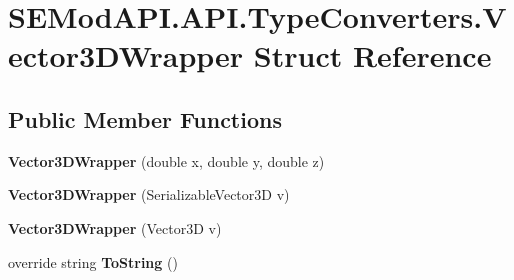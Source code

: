 \hypertarget{struct_s_e_mod_a_p_i_1_1_a_p_i_1_1_type_converters_1_1_vector3_d_wrapper}{}\section{S\+E\+Mod\+A\+P\+I.\+A\+P\+I.\+Type\+Converters.\+Vector3\+D\+Wrapper Struct Reference}
\label{struct_s_e_mod_a_p_i_1_1_a_p_i_1_1_type_converters_1_1_vector3_d_wrapper}
\subsection*{Public Member Functions}
\begin{DoxyCompactItemize}
\item 
\hypertarget{struct_s_e_mod_a_p_i_1_1_a_p_i_1_1_type_converters_1_1_vector3_d_wrapper_a7051905668d1cf6e0e4604af47ca4b85}{}{\bfseries Vector3\+D\+Wrapper} (double x, double y, double z)\label{struct_s_e_mod_a_p_i_1_1_a_p_i_1_1_type_converters_1_1_vector3_d_wrapper_a7051905668d1cf6e0e4604af47ca4b85}

\item 
\hypertarget{struct_s_e_mod_a_p_i_1_1_a_p_i_1_1_type_converters_1_1_vector3_d_wrapper_a9c2ccf83450d8d45e885a6e7478cc19a}{}{\bfseries Vector3\+D\+Wrapper} (Serializable\+Vector3\+D v)\label{struct_s_e_mod_a_p_i_1_1_a_p_i_1_1_type_converters_1_1_vector3_d_wrapper_a9c2ccf83450d8d45e885a6e7478cc19a}

\item 
\hypertarget{struct_s_e_mod_a_p_i_1_1_a_p_i_1_1_type_converters_1_1_vector3_d_wrapper_ac1474f5ecb63f11e7368c9008bcb9ff1}{}{\bfseries Vector3\+D\+Wrapper} (Vector3\+D v)\label{struct_s_e_mod_a_p_i_1_1_a_p_i_1_1_type_converters_1_1_vector3_d_wrapper_ac1474f5ecb63f11e7368c9008bcb9ff1}

\item 
\hypertarget{struct_s_e_mod_a_p_i_1_1_a_p_i_1_1_type_converters_1_1_vector3_d_wrapper_a688840c2ce6923e2086fbc06175cf474}{}override string {\bfseries To\+String} ()\label{struct_s_e_mod_a_p_i_1_1_a_p_i_1_1_type_converters_1_1_vector3_d_wrapper_a688840c2ce6923e2086fbc06175cf474}

\end{DoxyCompactItemize}
